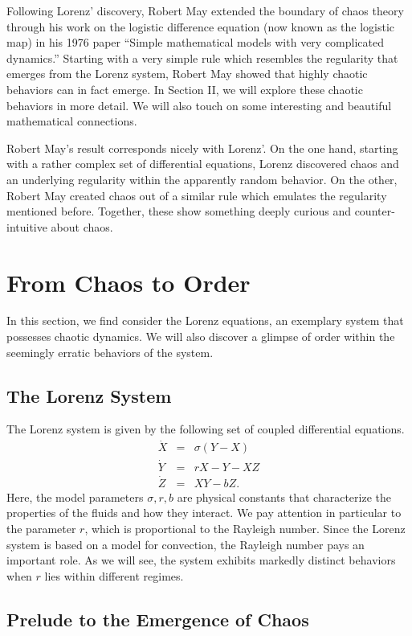 \documentclass[twocolumn,amsmath,amssymb,aps]{revtex4}
\begin{document}
Following Lorenz' discovery, Robert May extended the boundary of chaos theory through his work on the logistic difference equation (now known as the logistic map) in his 1976 paper ``Simple mathematical models with very complicated dynamics.'' \cite{rmay76} Starting with a very simple rule which resembles the regularity that emerges from the Lorenz system, Robert May showed that highly chaotic behaviors can in fact emerge. In Section II, we will explore these chaotic behaviors in more detail. We will also touch on some interesting and beautiful mathematical connections.

Robert May's result corresponds nicely with Lorenz'. On the one hand, starting with a rather complex set of differential equations, Lorenz discovered chaos and an underlying regularity within the apparently random behavior. On the other, Robert May created chaos out of a similar rule which emulates the regularity mentioned before. Together, these show something deeply curious and counter-intuitive about chaos.




\section{From Chaos to Order}
In this section, we find consider the Lorenz equations, an exemplary system that possesses chaotic dynamics. We will also discover a glimpse of order within the seemingly erratic behaviors of the system.  
\subsection{The Lorenz System}
The Lorenz system is given by the following set of coupled differential equations.\cite{flow}
\begin{eqnarray}
\dot{X} &=& \sigma(Y-X)\nonumber\\
\dot{Y} &=& r X - Y - XZ\nonumber\\
\dot{Z} &=& XY - bZ\nonumber.
\end{eqnarray}
Here, the model parameters $\sigma, r, b$ are physical constants that characterize the properties of the fluids and how they interact. We pay attention in particular to the parameter $r$, which is proportional to the Rayleigh number. Since the Lorenz system is based on a model for convection, the Rayleigh number pays an important role. As we will see, the system exhibits markedly distinct behaviors when $r$ lies within different regimes.

\subsection{Prelude to the Emergence of Chaos}
\end{document}
